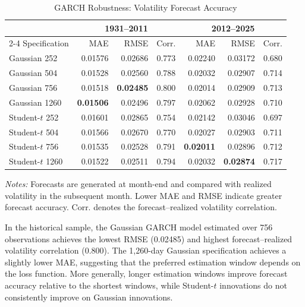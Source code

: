 \documentclass[11pt]{article}
\begin{document}
\begin{table}[htbp]
\centering
\caption{GARCH Robustness: Volatility Forecast Accuracy}
\label{tab:garch_robustness_accuracy}
\small
\begin{tabular}{lrrrrrr}
\hline
& \multicolumn{3}{c}{1931--2011}
& \multicolumn{3}{c}{2012--2025} \\
\cline{2-4}\cline{5-7}
Specification & MAE & RMSE & Corr.
              & MAE & RMSE & Corr. \\
\hline
Gaussian 252  & 0.01576 & 0.02686 & 0.773
              & 0.02240 & 0.03172 & 0.680 \\
Gaussian 504  & 0.01528 & 0.02560 & 0.788
              & 0.02032 & 0.02907 & 0.714 \\
Gaussian 756  & 0.01518 & \textbf{0.02485} & 0.800
              & 0.02014 & 0.02909 & 0.713 \\
Gaussian 1260 & \textbf{0.01506} & 0.02496 & 0.797
              & 0.02062 & 0.02928 & 0.710 \\
Student-$t$ 252  & 0.01601 & 0.02865 & 0.754
                 & 0.02142 & 0.03046 & 0.697 \\
Student-$t$ 504  & 0.01566 & 0.02670 & 0.770
                 & 0.02027 & 0.02903 & 0.711 \\
Student-$t$ 756  & 0.01535 & 0.02528 & 0.791
                 & \textbf{0.02011} & 0.02896 & 0.712 \\
Student-$t$ 1260 & 0.01522 & 0.02511 & 0.794
                 & 0.02032 & \textbf{0.02874} & 0.717 \\
\hline
\end{tabular}
\begin{flushleft}
\footnotesize
\textit{Notes:} Forecasts are generated at month-end and compared
with realized volatility in the subsequent month. Lower MAE and
RMSE indicate greater forecast accuracy. Corr. denotes the
forecast--realized volatility correlation.
\end{flushleft}
\end{table}

In the historical sample, the Gaussian GARCH model estimated over
756 observations achieves the lowest RMSE (0.02485) and highest
forecast--realized volatility correlation (0.800). The 1,260-day
Gaussian specification achieves a slightly lower MAE, suggesting
that the preferred estimation window depends on the loss function.
More generally, longer estimation windows improve forecast
accuracy relative to the shortest windows, while Student-$t$
innovations do not consistently improve on Gaussian innovations.
\end{document}
